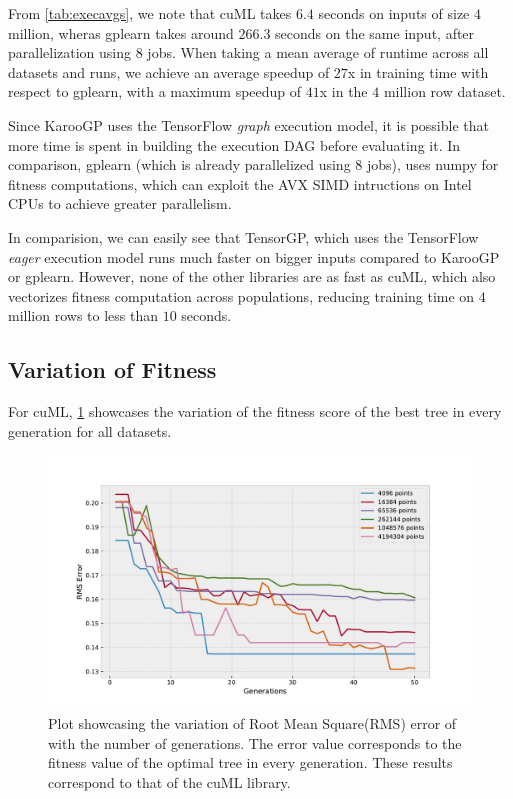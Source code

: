 From \cref{tab:execavgs}, we note that cuML takes $6.4$ seconds on inputs of size $4$ million, wheras gplearn takes around $266.3$ seconds on the same input, after parallelization using $8$ jobs. When taking a mean average of runtime across all datasets and runs, we achieve an average speedup of $27$x in training time with respect to gplearn, with a maximum speedup of $41$x in the $4$ million row dataset.

Since KarooGP uses the TensorFlow \textit{graph} execution model, it is possible that more time is spent in building the execution DAG before evaluating it. In comparison, gplearn (which is already parallelized using $8$ jobs), uses numpy for fitness computations, which can exploit the AVX SIMD intructions on Intel CPUs to achieve greater parallelism. 

In comparision, we can easily see that TensorGP, which uses the TensorFlow \textit{eager} execution model runs much faster on bigger inputs compared to KarooGP or gplearn. However, none of the other libraries are as fast as cuML, which also vectorizes fitness computation across populations, reducing training time on $4$ million rows to less than $10$ seconds.

\subsection{Variation of Fitness}
\label{subsec:fitnessvar}


For cuML, \cref{fig:besttrainfit} showcases the variation of the fitness score of the best tree in every generation for all datasets. 

\begin{figure}[htbp]
  \centering
  \includegraphics[scale=0.59]{images/RMSError.pdf}
  \caption{Plot showcasing the variation of Root Mean Square(RMS) error of with the number of generations. The error value corresponds to the fitness value of the optimal tree in every generation. These results correspond to that of the cuML library. }
  \label{fig:besttrainfit}
\end{figure}


